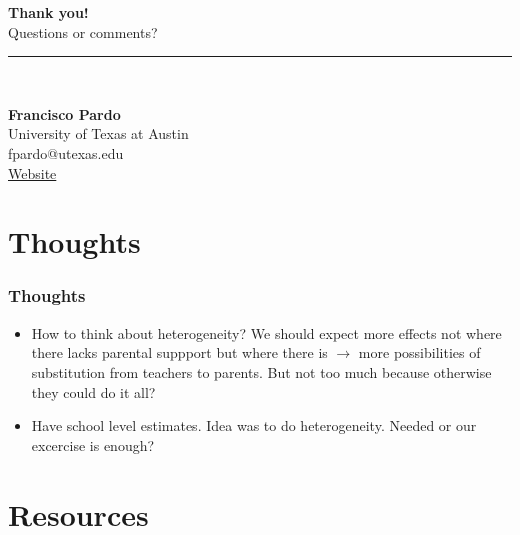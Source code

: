 \documentclass{beamer}
\begin{document}
\begin{frame}
    \hypersetup{citecolor=blue}
  \centering
  \vspace{2cm}
  {\Huge \textbf{Thank you!}} \\[1cm]
  
  {\Large Questions or comments?} \\[0.5cm]
  
  \rule{0.4\linewidth}{0.4pt} \\[0.5cm]
  
  \begin{flushleft}
    \textbf{Francisco Pardo} \\
    University of Texas at Austin \\
    fpardo@utexas.edu \\
    \href{https://francisco-pardo-pajuelo.github.io/}{Website}
  \end{flushleft}

\end{frame}




\section{Thoughts}

\begin{frame}
    \label{frame:thoughts}
    \frametitle{Thoughts}
    \begin{itemize}
        \item How to think about heterogeneity? We should expect more effects not where there lacks parental suppport but where there is $\rightarrow$ more possibilities of substitution from teachers to parents. But not too much because otherwise they could do it all?
        \item Have school level estimates. Idea was to do heterogeneity. Needed or our excercise is enough?
    \end{itemize}


\end{frame}




\section{Resources}
\end{document}
